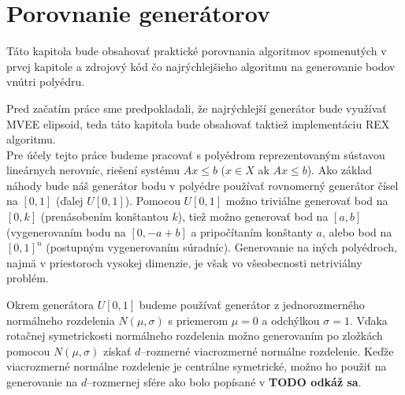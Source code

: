 \chapter{Porovnanie generátorov}

Táto kapitola bude obsahovať praktické porovnania algoritmov spomenutých v prvej kapitole a zdrojový kód čo najrýchlejšieho algoritmu na generovanie bodov vnútri polyédru.

Pred začatím práce sme predpokladali, že najrýchlejší generátor bude využívať MVEE elipsoid, teda táto kapitola bude obsahovať taktiež implementáciu REX algoritmu.\\

Pre účely tejto práce budeme pracovať s polyédrom reprezentovaným sústavou lineárnych nerovníc, riešení systému $Ax \leq b$ ($x \in X$ ak $Ax \leq b$).
Ako základ náhody bude náš generátor bodu v polyédre používať rovnomerný generátor čísel na $[0,1]$ (ďalej $U[0,1]$). Pomocou $U[0,1]$ možno triviálne generovať bod na $[0,k]$ (prenásobením konštantou $k$), tiež možno generovať bod na $[a,b]$ (vygenerovaním bodu na $[0, -a+b]$ a pripočítaním konštanty $a$, alebo bod na $[0,1]^n$ (postupným vygenerovaním súradníc). Generovanie na iných polyédroch, najmä v priestoroch vysokej dimenzie, je však vo všeobecnosti netriviálny problém.

Okrem generátora $U[0,1]$ budeme používať generátor z jednorozmerného normálneho rozdelenia $N(\mu, \sigma)$ s priemerom $\mu=0$ a odchýlkou $\sigma=1$. Vďaka rotačnej symetrickosti normálneho rozdelenia možno generovaním po zložkách pomocou $N(\mu, \sigma)$ získať $d$--rozmerné viacrozmerné normálne rozdelenie.
Keďže viacrozmerné normálne rozdelenie je centrálne symetrické, možno ho použiť na generovanie na $d$--rozmernej sfére ako bolo popísané v \textbf{TODO odkáž sa}.
